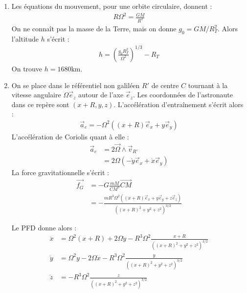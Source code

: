 \newpage

\begin{correction}

\begin{enumerate}
	
	\item Les équations du mouvement, pour une orbite circulaire, donnent :
	\begin{align*}
		R\Omega^2=\frac{GM}{R^2}
	\end{align*}
	On ne connaît pas la masse de la Terre, mais on donne $g_0=GM/R_T^2$. Alors l'altitude $h$ s'écrit :
	\begin{align*}
		h=\left( \frac{g_0R_T^2}{\Omega^2}\right)^{1/3}-R_T 
	\end{align*}
	On trouve $h=1680$km.
	
	\item On se place dans le référentiel non galiléen $R'$ de centre $C$ tournant à la vitesse angulaire $\Omega\vec{e}_z$ autour de l'axe $\vec{e}_z$. Les coordonnées de l'astronaute dans ce repère sont $(x+R,y,z)$. L'accélération d'entraînement s'écrit alors :
	\begin{align*}
		\vec{a}_e=-\Omega^2\left((x+R)\vec{e}_x+y\vec{e}_y \right) 
	\end{align*}
	L'accélération de Coriolis quant à elle :
	\begin{align*}
		\vec{a}_c&=2\vec{\Omega}\wedge\vec{v}_{R'}\\
		&=2\Omega(-\dot{y}\vec{e}_x+\dot{x}\vec{e}_y)
	\end{align*}
	La force gravitationnelle s'écrit :
	\begin{align*}
		\vec{f_G}&=-G\frac{mM}{CM^3}\overrightarrow{CM}\\
		&=-\frac{mR^3\Omega^2((x+R)\vec{e}_x+y\vec{e}_y+z\vec{e}_z)}{\left((x+R)^2+y^2+z^2\right)^{3/2}}
	\end{align*}
	
	Le PFD donne alors :
	\begin{align*}
		\ddot{x}&=\Omega^2(x+R)+2\Omega\dot{y}-R^3\Omega^2\frac{x+R}{{\left((x+R)^2+y^2+z^2\right)^{3/2}}} \\
		\ddot{y}&=\Omega^2y-2\Omega\dot{x}-R^3\Omega^2\frac{y}{{\left((x+R)^2+y^2+z^2\right)^{3/2}}} \\
		\ddot{z}&=-R^3\Omega^2\frac{z}{{\left((x+R)^2+y^2+z^2\right)^{3/2}}}
	\end{align*}
	

\end{enumerate}
\end{correction}
